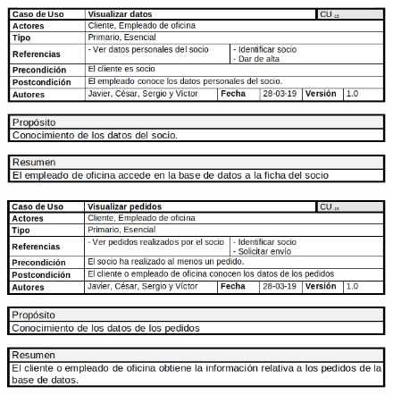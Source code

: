 \begin{figure}[H]
	\centering
	\includegraphics[width=16cm]{15}
\end{figure}
\begin{figure}[H]
	\centering
	\includegraphics[width=16cm]{16}
\end{figure}

\newpage

